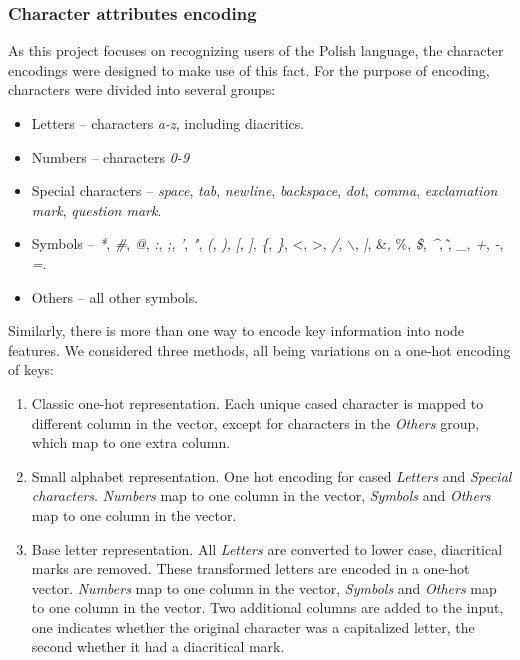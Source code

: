 \subsubsection{Character attributes encoding}
\label{Base_letter_representation}
As this project focuses on recognizing users of the Polish language, the character encodings were designed to make use of this fact. For the purpose of encoding, characters were divided into several groups:\\
\begin{itemize}
	\item Letters -- characters \textit{a-z}, including diacritics.
	\item Numbers -- characters \textit{0-9}
	\item Special characters -- \textit{space}, \textit{tab}, \textit{newline}, \textit{backspace}, \textit{dot}, \textit{comma}, \textit{exclamation mark}, \textit{question mark}.
	\item Symbols -- \textit{*}, \textit{\#}, \textit{@}, \textit{:}, \textit{;},   \textit{'}, \textit{"}, \textit{(}, \textit{)}, \textit{[}, \textit{]}, \textit{\{}, \textit{\}}, \textless, \textgreater, \textit{/}, \textit{$\backslash$}, \textit{|}, \&, \%, \textit{\$}, \textit{\^}, \~, \textit{\_}, \textit{+}, \textit{-}, \textit{=}. 
	\item Others -- all other symbols.
\end{itemize}
Similarly, there is more than one way to encode key information into node features.
We considered three methods, all being variations on a one-hot encoding of keys:
\begin{enumerate}
	\item Classic one-hot representation. Each unique cased character is mapped to different column in the vector, except for characters in the \textit{Others} group, which map to one extra column.
	\item Small alphabet representation. One hot encoding for cased \textit{Letters} and \textit{Special characters}. \textit{Numbers} map to one column in the vector, \textit{Symbols} and \textit{Others} map to one column in the vector.
	\item Base letter representation. All \textit{Letters} are converted to lower case, diacritical marks are removed. These transformed letters are encoded in a one-hot vector. \textit{Numbers} map to one column in the vector, \textit{Symbols} and \textit{Others} map to one column in the vector. Two additional columns are added to the input, one indicates whether the original character was a capitalized letter, the second whether it had a diacritical mark.
\end{enumerate}


